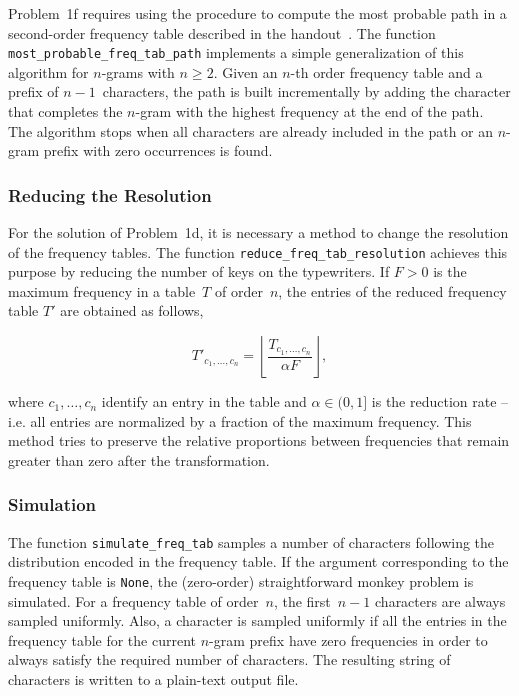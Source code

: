 \documentclass[conference]{IEEEtran}
\newcommand{\codeinline}[1]{{\fontsize{8}{0}\selectfont\texttt{#1}}}
\begin{document}
Problem~1f requires using the procedure to compute the most probable path in a second-order frequency table described in the handout~\cite{Bennett1976}.
The function \codeinline{most\_probable\_freq\_tab\_path} implements a simple generalization of this algorithm for \mbox{\mbox{$n$-gram}s} with $n\geq2$.
Given an $n$-th order frequency table and a prefix of $n-1$~characters, the path is built incrementally by adding the character that completes the \mbox{$n$-gram} with the highest frequency at the end of the path.
The algorithm stops when all characters are already included in the path or an \mbox{$n$-gram} prefix with zero occurrences is found.

\vspace{0.5em}
\subsubsection{Reducing the Resolution}

For the solution of Problem~1d, it is necessary a method to change the resolution of the frequency tables.
The function \codeinline{reduce\_freq\_tab\_resolution} achieves this purpose by reducing the number of keys on the typewriters.
If $F>0$ is the maximum frequency in a table~$T$ of order~$n$, the entries of the reduced frequency table $T'$ are obtained as follows,

$$T'_{c_1,\ldots,c_n} = \left\lfloor\frac{T_{c_1,\ldots,c_n}}{\alpha F}\right\rfloor,$$

\noindent where $c_1,\ldots,c_n$ identify an entry in the table and $\alpha \in (0,1]$ is the reduction rate 
-- i.e. all entries are normalized by a fraction of the maximum frequency.
This method tries to preserve the relative proportions between frequencies that remain greater than zero after the transformation.

\vspace{0.5em}
\subsubsection{Simulation}

The function \codeinline{simulate\_freq\_tab} samples a number of characters following the distribution encoded in the frequency table.
If the argument corresponding to the frequency table is \codeinline{None}, the (zero-order) straightforward monkey problem is simulated.
For a frequency table of order~$n$, the first~$n-1$ characters are always sampled uniformly.
Also, a character is sampled uniformly if all the entries in the frequency table for the current \mbox{$n$-gram} prefix have zero frequencies in order to always satisfy the required number of characters.
The resulting string of characters is written to a plain-text output file.
\end{document}
